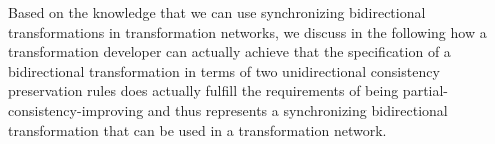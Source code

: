 Based on the knowledge that we can use synchronizing bidirectional transformations in transformation networks, we discuss in the following how a transformation developer can actually achieve that the specification of a bidirectional transformation in terms of two unidirectional consistency preservation rules does actually fulfill the requirements of being partial-consistency-improving and thus represents a synchronizing bidirectional transformation that can be used in a transformation network.











